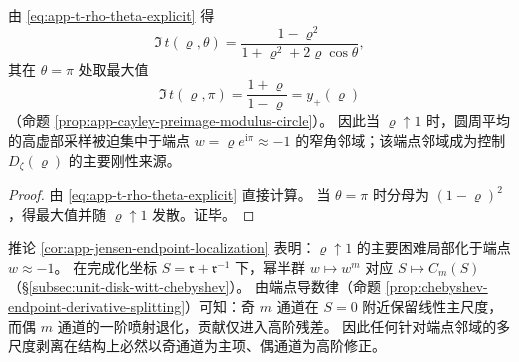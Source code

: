 \begin{corollary}\label{cor:app-jensen-endpoint-localization}
由 \eqref{eq:app-t-rho-theta-explicit} 得
\[
\Im\,t(\varrho,\theta)=\frac{1-\varrho^2}{1+\varrho^2+2\varrho\cos\theta},
\]
其在 \(\theta=\pi\) 处取最大值
\[
\Im\,t(\varrho,\pi)=\frac{1+\varrho}{1-\varrho}=y_{+}(\varrho)
\]
（命题 \ref{prop:app-cayley-preimage-modulus-circle}）。
因此当 \(\varrho\uparrow 1\) 时，圆周平均的高虚部采样被迫集中于端点 \(w=\varrho e^{\mathrm{i}\pi}\approx-1\) 的窄角邻域；该端点邻域成为控制 \(D_{\zeta}(\varrho)\) 的主要刚性来源。
\end{corollary}
\begin{proof}
由 \eqref{eq:app-t-rho-theta-explicit} 直接计算。
当 \(\theta=\pi\) 时分母为 \((1-\varrho)^2\)，得最大值并随 \(\varrho\uparrow 1\) 发散。证毕。
\end{proof}




\begin{remark}\label{rem:app-jensen-odd-channel-priority}
推论 \ref{cor:app-jensen-endpoint-localization} 表明：\(\varrho\uparrow 1\) 的主要困难局部化于端点 \(w\approx-1\)。
在完成化坐标 \(S=\mathfrak{r}+\mathfrak{r}^{-1}\) 下，幂半群 \(w\mapsto w^m\) 对应 \(S\mapsto C_m(S)\)（\S\ref{subsec:unit-disk-witt-chebyshev}）。
由端点导数律（命题 \ref{prop:chebyshev-endpoint-derivative-splitting}）可知：奇 \(m\) 通道在 \(S=0\) 附近保留线性主尺度，而偶 \(m\) 通道的一阶喷射退化，贡献仅进入高阶残差。
因此任何针对端点邻域的多尺度剥离在结构上必然以奇通道为主项、偶通道为高阶修正。
\end{remark}

